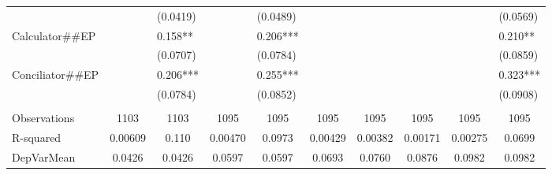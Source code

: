 \begin{tabular}{rrrrrrrrrr}
\multicolumn{1}{l}{} & \multicolumn{1}{l}{} & \multicolumn{1}{l}{(0.0419)} & \multicolumn{1}{l}{} & \multicolumn{1}{l}{(0.0489)} & \multicolumn{1}{l}{} & \multicolumn{1}{l}{} & \multicolumn{1}{l}{} & \multicolumn{1}{l}{} & \multicolumn{1}{l}{(0.0569)} \\
\multicolumn{1}{l}{Calculator\#\#EP} & \multicolumn{1}{l}{} & \multicolumn{1}{l}{0.158**} & \multicolumn{1}{l}{} & \multicolumn{1}{l}{0.206***} & \multicolumn{1}{l}{} & \multicolumn{1}{l}{} & \multicolumn{1}{l}{} & \multicolumn{1}{l}{} & \multicolumn{1}{l}{0.210**} \\
\multicolumn{1}{l}{} & \multicolumn{1}{l}{} & \multicolumn{1}{l}{(0.0707)} & \multicolumn{1}{l}{} & \multicolumn{1}{l}{(0.0784)} & \multicolumn{1}{l}{} & \multicolumn{1}{l}{} & \multicolumn{1}{l}{} & \multicolumn{1}{l}{} & \multicolumn{1}{l}{(0.0859)} \\
\multicolumn{1}{l}{Conciliator\#\#EP} & \multicolumn{1}{l}{} & \multicolumn{1}{l}{0.206***} & \multicolumn{1}{l}{} & \multicolumn{1}{l}{0.255***} & \multicolumn{1}{l}{} & \multicolumn{1}{l}{} & \multicolumn{1}{l}{} & \multicolumn{1}{l}{} & \multicolumn{1}{l}{0.323***} \\
\multicolumn{1}{l}{} & \multicolumn{1}{l}{} & \multicolumn{1}{l}{(0.0784)} & \multicolumn{1}{l}{} & \multicolumn{1}{l}{(0.0852)} & \multicolumn{1}{l}{} & \multicolumn{1}{l}{} & \multicolumn{1}{l}{} & \multicolumn{1}{l}{} & \multicolumn{1}{l}{(0.0908)} \\
\multicolumn{1}{l}{} & \multicolumn{1}{l}{} & \multicolumn{1}{l}{} & \multicolumn{1}{l}{} & \multicolumn{1}{l}{} & \multicolumn{1}{l}{} & \multicolumn{1}{l}{} & \multicolumn{1}{l}{} & \multicolumn{1}{l}{} & \multicolumn{1}{l}{} \\
\midrule
\multicolumn{1}{l}{Observations} & \multicolumn{1}{c}{1103} & \multicolumn{1}{c}{1103} & \multicolumn{1}{c}{1095} & \multicolumn{1}{c}{1095} & \multicolumn{1}{c}{1095} & \multicolumn{1}{c}{1095} & \multicolumn{1}{c}{1095} & \multicolumn{1}{c}{1095} & \multicolumn{1}{c}{1095} \\
\multicolumn{1}{l}{R-squared} & \multicolumn{1}{c}{0.00609} & \multicolumn{1}{c}{0.110} & \multicolumn{1}{c}{0.00470} & \multicolumn{1}{c}{0.0973} & \multicolumn{1}{c}{0.00429} & \multicolumn{1}{c}{0.00382} & \multicolumn{1}{c}{0.00171} & \multicolumn{1}{c}{0.00275} & \multicolumn{1}{c}{0.0699} \\
\multicolumn{1}{l}{DepVarMean} & \multicolumn{1}{c}{0.0426} & \multicolumn{1}{c}{0.0426} & \multicolumn{1}{c}{0.0597} & \multicolumn{1}{c}{0.0597} & \multicolumn{1}{c}{0.0693} & \multicolumn{1}{c}{0.0760} & \multicolumn{1}{c}{0.0876} & \multicolumn{1}{c}{0.0982} & \multicolumn{1}{c}{0.0982} \\

\end{tabular}

